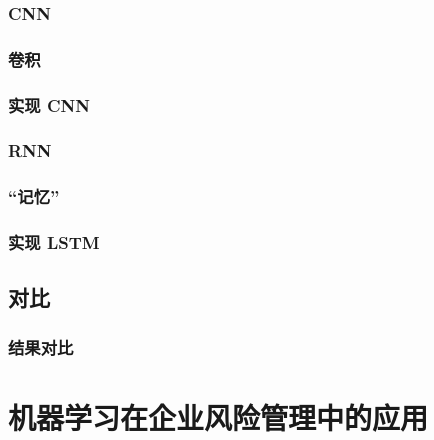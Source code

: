 \documentclass{ctexbeamer}
\begin{document}
\subsubsection{CNN}
\begin{frame}
    \frametitle{卷积}
\end{frame}
\begin{frame}
    \frametitle{实现 CNN}
\end{frame}
\subsubsection{RNN}
\begin{frame}
    \frametitle{“记忆”}
\end{frame}
\begin{frame}
    \frametitle{实现 LSTM}
\end{frame}
\subsection{对比}
\begin{frame}
    \frametitle{结果对比}
\end{frame}
\section{机器学习在企业风险管理中的应用}
\end{document}
